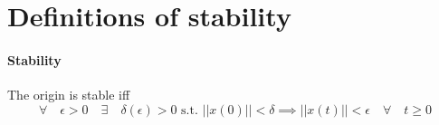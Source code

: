 
\section{Definitions of stability}
\paragraph{Stability} The origin is stable iff
\begin{equation}
	\forall \quad \epsilon > 0 \quad \exists \quad \delta(\epsilon) > 0
	\mbox{ s.t. }
	||x(0)|| < \delta \implies ||x(t)|| < \epsilon \quad \forall \quad t \geq 0
\end{equation}
